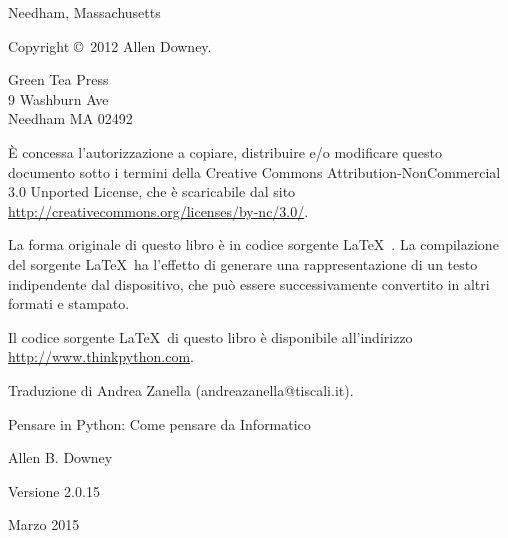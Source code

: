 \documentclass[10pt]{book}
\newcommand{\thetitle}{Pensare in Python: Come pensare da Informatico}
\newcommand{\theversion}{2.0.15}
\newcommand{\thedate}{Marzo 2015}
\begin{document}
\begin{latexonly}
\begin{flushright}
{\small Needham, Massachusetts}

\vfill

\end{flushright}


\pagebreak
\thispagestyle{empty}

{\small
Copyright \copyright ~2012 Allen Downey.


\vspace{0.2in}

\begin{flushleft}
Green Tea Press       \\
9 Washburn Ave        \\
Needham MA 02492
\end{flushleft}

È concessa l'autorizzazione a copiare, distribuire e/o modificare questo documento sotto i termini della Creative Commons Attribution-NonCommercial 3.0 Unported License, che è scaricabile dal sito \url{http://creativecommons.org/licenses/by-nc/3.0/}.

La forma originale di questo libro è in codice sorgente \LaTeX\ . La compilazione del sorgente \LaTeX\ ha l'effetto di generare una rappresentazione di un testo indipendente dal dispositivo, che può essere successivamente convertito in altri formati e stampato.

Il codice sorgente \LaTeX\ di questo libro è disponibile all'indirizzo
\url{http://www.thinkpython.com}.

\vspace{0.2in}
Traduzione di Andrea Zanella (andreazanella@tiscali.it).


\vspace{0.2in}

} %

\end{latexonly}



\begin{htmlonly}


{\Large \thetitle}

{\large Allen B. Downey}

Versione \theversion

\thedate

\setcounter{chapter}{-1}

\end{htmlonly}
\end{document}
